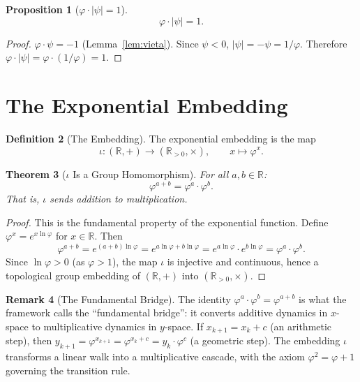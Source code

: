 \documentclass[11pt,a4paper]{article}
\theoremstyle{plain}
\newtheorem{theorem}{Theorem}[section]
\newtheorem{proposition}[theorem]{Proposition}
\theoremstyle{definition}
\newtheorem{definition}[theorem]{Definition}
\newtheorem{remark}[theorem]{Remark}
\newcommand{\R}{\mathbb{R}}
\newcommand{\vp}{\varphi}
\newcommand{\ps}{\psi}
\begin{document}
\begin{proposition}[$\vp \cdot |\ps| = 1$]\label{prop:phi-psi-product}
\begin{equation}\label{eq:phi-psi-abs}
  \vp \cdot |\ps| = 1.
\end{equation}
\end{proposition}

\begin{proof}
$\vp \cdot \ps = -1$ (Lemma~\ref{lem:vieta}).  Since $\ps < 0$,
$|\ps| = -\ps = 1/\vp$.  Therefore $\vp \cdot |\ps| = \vp \cdot (1/\vp) = 1$.
\end{proof}

\section{The Exponential Embedding}\label{sec:embedding}

\begin{definition}[The Embedding]\label{def:embedding}
The exponential embedding is the map
\begin{equation}\label{eq:embedding}
  \iota : (\R, +) \to (\R_{>0}, \times), \qquad x \mapsto \vp^{x}.
\end{equation}
\end{definition}

\begin{theorem}[$\iota$ Is a Group Homomorphism]\label{thm:homomorphism}
For all $a, b \in \R$:
\begin{equation}\label{eq:homo}
  \vp^{a+b} = \vp^{a} \cdot \vp^{b}.
\end{equation}
That is, $\iota$ sends addition to multiplication.
\end{theorem}

\begin{proof}
This is the fundamental property of the exponential function.
Define $\vp^{x} = e^{x \ln \vp}$ for $x \in \R$.  Then
\[
  \vp^{a+b} = e^{(a+b)\ln\vp} = e^{a\ln\vp + b\ln\vp}
  = e^{a\ln\vp} \cdot e^{b\ln\vp} = \vp^{a} \cdot \vp^{b}.
\]
Since $\ln\vp > 0$ (as $\vp > 1$), the map $\iota$ is injective and
continuous, hence a topological group embedding of $(\R, +)$ into
$(\R_{>0}, \times)$.
\end{proof}

\begin{remark}[The Fundamental Bridge]\label{rem:bridge}
The identity $\vp^{a} \cdot \vp^{b} = \vp^{a+b}$ is what the
framework calls the ``fundamental bridge'': it converts additive
dynamics in $x$-space to multiplicative dynamics in $y$-space.
If $x_{k+1} = x_{k} + c$ (an arithmetic step), then
$y_{k+1} = \vp^{x_{k+1}} = \vp^{x_{k} + c} = y_{k} \cdot \vp^{c}$
(a geometric step).  The embedding $\iota$ transforms a linear walk
into a multiplicative cascade, with the axiom $\vp^{2} = \vp + 1$
governing the transition rule.
\end{remark}
\end{document}

